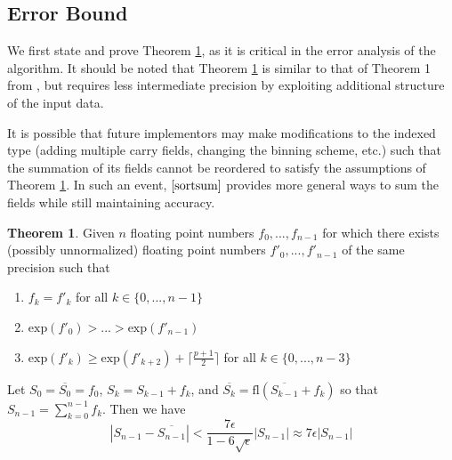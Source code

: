 \documentclass[12pt]{article}
\providecommand{\exp}{\ensuremath{\text{exp}}}
\providecommand{\fl}{\ensuremath{\text{fl}}}
\theoremstyle{definition}
\newtheorem{thm}{Theorem}[section]
\numberwithin{equation}{section}
\numberwithin{figure}{section}
\begin{document}
  \subsection{Error Bound}
    \label{sec:primitiveops_error}

    We first state and prove Theorem \ref{thm:mysortsum}, as it is critical in the error analysis of the algorithm. It should be noted that Theorem \ref{thm:mysortsum} is similar to that of Theorem 1 from \cite{sortsum}, but requires less intermediate precision by exploiting additional structure of the input data.

    It is possible that future implementors may make modifications to the indexed type (adding multiple carry fields, changing the binning scheme, etc.) such that the summation of its fields cannot be reordered to satisfy the assumptions of Theorem \ref{thm:mysortsum}. In such an event, $\cite{sortsum}$ provides more general ways to sum the fields while still maintaining accuracy.
      \begin{samepage}
    \begin{thm}
      Given $n$ floating point numbers $f_0, ..., f_{n - 1}$ for which there exists (possibly unnormalized) floating point numbers $f'_0, ..., f'_{n - 1}$ of the same precision such that
      \begin{enumerate}
        \item $f_k = f'_k$ for all $k \in \{0, ..., n - 1\}$
        \item $\exp(f'_0) > ... > \exp(f'_{n - 1})$
        \item $\exp(f'_k) \geq \exp(f'_{k + 2}) + \lceil\frac{p + 1}{2}\rceil$ for all $k \in \{0, ..., n - 3\}$
      \end{enumerate}
      \label{thm:mysortsum}
      Let $S_0 = \overline{S_0} = f_0$, $S_k = S_{k - 1} + f_k$, and $\overline{S_k} = \fl(\overline{S_{k - 1}} + f_k)$ so that $S_{n - 1} = \sum \limits_{k = 0}^{n - 1} f_k$.
      Then we have
      \begin{equation*}
        \left|S_{n - 1} - \overline{S_{n - 1}}\right| < \frac{7\epsilon}{1 - 6\sqrt\epsilon}|S_{n - 1}| \approx 7 \epsilon |S_{n - 1}|
      \end{equation*}
    \end{thm}
    \end{samepage}
\end{document}
